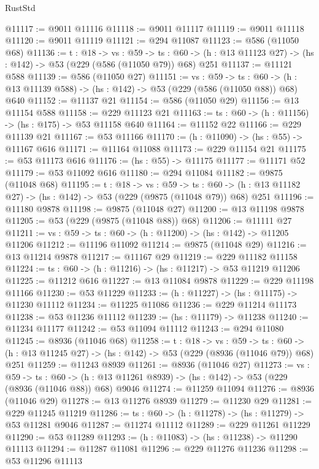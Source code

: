 \begin{lexlean}{RustStd}
\begin{coremodule}
@11117 := @9011 @11116
@11118 := @9011 @11117
@11119 := @9011 @11118
@11120 := @9011 @11119
@11121 := @294 @11087
@11123 := @586 (@11050 @68)
@11136 := {t : @18} ->
  {vs : @59} ->
  {ts : @60} -> (h : @13 @11123 @27) -> (hs : @142) -> @53 (@229 (@586 (@11050 @79)) @68) @251
@11137 := @11121 @588
@11139 := @586 (@11050 @27)
@11151 := {vs : @59} ->
  {ts : @60} -> (h : @13 @11139 @588) -> (hs : @142) -> @53 (@229 (@586 (@11050 @88)) @68) @640
@11152 := @11137 @21
@11154 := @586 (@11050 @29)
@11156 := @13 @11154 @588
@11158 := @229 @11123 @21
@11163 := {ts : @60} -> (h : @11156) -> (hs : @175) -> @53 @11158 @640
@11164 := @11152 @22
@11166 := @229 @11139 @21
@11167 := @53 @11166
@11170 := (h : @11090) -> (hs : @55) -> @11167 @616
@11171 := @11164 @11088
@11173 := @229 @11154 @21
@11175 := @53 @11173 @616
@11176 := (hs : @55) -> @11175
@11177 := @11171 @52
@11179 := @53 @11092 @616
@11180 := @294 @11084
@11182 := @9875 (@11048 @68)
@11195 := {t : @18} ->
  {vs : @59} ->
  {ts : @60} -> (h : @13 @11182 @27) -> (hs : @142) -> @53 (@229 (@9875 (@11048 @79)) @68) @251
@11196 := @11180 @9878
@11198 := @9875 (@11048 @27)
@11200 := @13 @11198 @9878
@11205 := @53 (@229 (@9875 (@11048 @88)) @68)
@11206 := @11111 @27
@11211 := {vs : @59} -> {ts : @60} -> (h : @11200) -> (hs : @142) -> @11205 @11206
@11212 := @11196 @11092
@11214 := @9875 (@11048 @29)
@11216 := @13 @11214 @9878
@11217 := @11167 @29
@11219 := @229 @11182 @11158
@11224 := {ts : @60} -> (h : @11216) -> (hs : @11217) -> @53 @11219 @11206
@11225 := @11212 @616
@11227 := @13 @11084 @9878
@11229 := @229 @11198 @11166
@11230 := @53 @11229
@11233 := (h : @11227) -> (hs : @11175) -> @11230 @11112
@11234 := @11225 @11086
@11236 := @229 @11214 @11173
@11238 := @53 @11236 @11112
@11239 := (hs : @11179) -> @11238
@11240 := @11234 @11177
@11242 := @53 @11094 @11112
@11243 := @294 @11080
@11245 := @8936 (@11046 @68)
@11258 := {t : @18} ->
  {vs : @59} ->
  {ts : @60} -> (h : @13 @11245 @27) -> (hs : @142) -> @53 (@229 (@8936 (@11046 @79)) @68) @251
@11259 := @11243 @8939
@11261 := @8936 (@11046 @27)
@11273 := {vs : @59} ->
  {ts : @60} -> (h : @13 @11261 @8939) -> (hs : @142) -> @53 (@229 (@8936 (@11046 @88)) @68) @9046
@11274 := @11259 @11094
@11276 := @8936 (@11046 @29)
@11278 := @13 @11276 @8939
@11279 := @11230 @29
@11281 := @229 @11245 @11219
@11286 := {ts : @60} -> (h : @11278) -> (hs : @11279) -> @53 @11281 @9046
@11287 := @11274 @11112
@11289 := @229 @11261 @11229
@11290 := @53 @11289
@11293 := (h : @11083) -> (hs : @11238) -> @11290 @11113
@11294 := @11287 @11081
@11296 := @229 @11276 @11236
@11298 := @53 @11296 @11113

\end{coremodule}
\end{lexlean}
